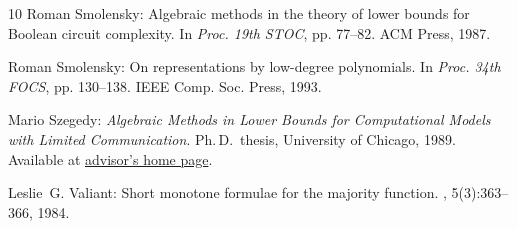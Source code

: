 \documentclass[11pt]{article}
\numberwithin{equation}{section}
\theoremstyle{definition}
\theoremstyle{plain}
\begin{document}
\begin{thebibliography}{10}
{\sc Roman Smolensky}: Algebraic methods in the theory of lower bounds for
  {B}oolean circuit complexity.
\newblock In {\em Proc. 19th STOC}, pp. 77--82. ACM Press, 1987.
\newblock [\epfmtdoi{10.1145/28395.28404}]

{\sc Roman Smolensky}: On representations by low-degree polynomials.
\newblock In {\em Proc. 34th FOCS}, pp. 130--138. IEEE Comp. Soc. Press, 1993.

{\sc Mario Szegedy}: {\em Algebraic Methods in Lower Bounds for Computational
  Models with Limited Communication}.
\newblock Ph.\,D.\ thesis, University of Chicago, 1989.
\newblock Available at
  \href{https://people.cs.uchicago.edu/~laci/students/szegedy.dir}{advisor's
  home page}.

{\sc Leslie~G. Valiant}: Short monotone formulae for the majority function.
, 5(3):363--366, 1984.
\newblock [\epfmtdoi{10.1016/0196-6774(84)90016-6}]

\end{thebibliography}
\end{document}
